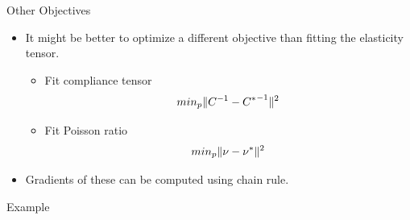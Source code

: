 \begin{frame}{Other Objectives}
    \begin{itemize}
        \item It might be better to optimize a different objective than fitting the elasticity tensor.
        \begin{itemize}
            \item Fit compliance tensor
                $$ min_p \lVert C^{-1} - {C^*}^{-1}\rVert^2 $$
            \item Fit Poisson ratio
                $$ min_p \lVert\nu - \nu^*\rVert^2 $$
        \end{itemize}
        \item Gradients of these can be computed using chain rule.
    \end{itemize}
\end{frame}

\begin{frame}{Example}
\end{frame}
